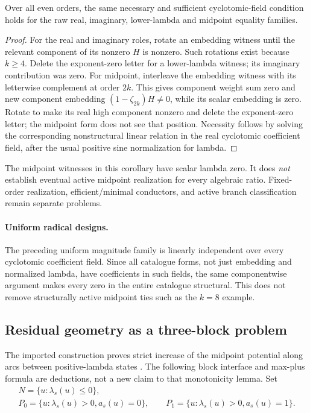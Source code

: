 \begin{corollary}
Over all even orders, the same necessary and sufficient cyclotomic-field condition holds for the raw real, imaginary, lower-lambda and midpoint equality families.
\end{corollary}
\begin{proof}
For the real and imaginary roles, rotate an embedding witness until the relevant component of its nonzero $H$ is nonzero. Such rotations exist because $k\ge4$. Delete the exponent-zero letter for a lower-lambda witness; its imaginary contribution was zero. For midpoint, interleave the embedding witness with its letterwise complement at order $2k$. This gives component weight sum zero and new component embedding $(1-\zeta_{2k})H\ne0$, while its scalar embedding is zero. Rotate to make its real high component nonzero and delete the exponent-zero letter; the midpoint form does not see that position. Necessity follows by solving the corresponding nonstructural linear relation in the real cyclotomic coefficient field, after the usual positive sine normalization for lambda.
\end{proof}
The midpoint witnesses in this corollary have scalar lambda zero. It does \emph{not} establish eventual active midpoint realization for every algebraic ratio. Fixed-order realization, efficient/minimal conductors, and active branch classification remain separate problems.

\paragraph{Uniform radical designs.}
The preceding uniform magnitude family is linearly independent over every cyclotomic coefficient field. Since all catalogue forms, not just embedding and normalized lambda, have coefficients in such fields, the same componentwise argument makes every zero in the entire catalogue structural. This does not remove structurally active midpoint ties such as the $k=8$ example.

\subsection{Residual geometry as a three-block problem}\label{ext:sec:paths}
The imported construction proves strict increase of the midpoint potential along arcs between positive-lambda states \cite{Babanskyy2026Parity}. The following block interface and max-plus formula are deductions, not a new claim to that monotonicity lemma.
Set
\[
\begin{gathered}
N=\{u:\lambda_s(u)\le0\},\\
P_0=\{u:\lambda_s(u)>0,a_s(u)=0\},\qquad
P_1=\{u:\lambda_s(u)>0,a_s(u)=1\}.
\end{gathered}
\]

